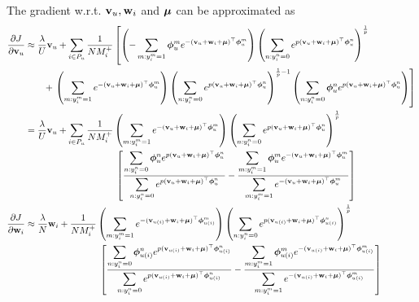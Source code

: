 The gradient w.r.t. $\mathbf{v}_u, \mathbf{w}_i$ and $\bm{\mu}$ can be approximated as 
\begin{equation*}
\begin{aligned}
\frac{\partial J}{\partial \bv_u}
&\approx \frac{\lambda}{U} \bv_u
  + \sum_{i \in P_u} \frac{1}{N M_i^+} \left[
    \left(-\sum_{m: y_i^m = 1} \phibm_u^m e^{-(\bv_u + \w_i + \mubm)^\top \phibm_u^m} \right)
    \left( \sum_{n: y_i^n = 0} e^{p (\bv_u + \w_i + \mubm)^\top \phibm_u^n} \right)^\frac{1}{p} \right. \\
& \hspace{2em} + \left.
    \left( \sum_{m: y_i^m = 1} e^{-(\bv_u + \w_i + \mubm)^\top \phibm_u^m} \right)
    \left( \sum_{n: y_i^n = 0} e^{p (\bv_u + \w_i + \mubm)^\top \phibm_u^n} \right)^{\frac{1}{p} - 1}
    \left( \sum_{n: y_i^n = 0} \phibm_u^n e^{p (\bv_u + \w_i + \mubm)^\top \phibm_u^n} \right) \right] \\
&= \frac{\lambda}{U} \bv_u
  + \sum_{i \in P_u} \frac{1}{N M_i^+} 
    \left( \sum_{m: y_i^m = 1} e^{-(\bv_u + \w_i + \mubm)^\top \phibm_u^m} \right)
    \left( \sum_{n: y_i^n = 0} e^{p (\bv_u + \w_i + \mubm)^\top \phibm_u^n} \right)^\frac{1}{p} \\
& \hspace{9.8em} \left[ 
    \frac{ \displaystyle \sum_{n: y_i^n = 0} \phibm_u^n e^{p (\bv_u + \w_i + \mubm)^\top \phibm_u^n} }
         { \displaystyle \sum_{n: y_i^n = 0} e^{p (\bv_u + \w_i + \mubm)^\top \phibm_u^n} }
    - \frac{ \displaystyle \sum_{m: y_i^m = 1} \phibm_u^m e^{-(\bv_u + \w_i + \mubm)^\top \phibm_u^m} }
           { \displaystyle \sum_{m: y_i^m = 1} e^{-(\bv_u + \w_i + \mubm)^\top \phibm_u^m} } \right] \\
%
\frac{\partial J}{\partial \w_i}
&\approx \frac{\lambda}{N} \w_i
  + \frac{1}{N M_i^+} 
    \left( \sum_{m: y_i^m = 1} e^{-(\bv_{u(i)} + \w_i + \mubm)^\top \phibm_{u(i)}^m} \right)
    \left( \sum_{n: y_i^n = 0} e^{p (\bv_{u(i)} + \w_i + \mubm)^\top \phibm_{u(i)}^n} \right)^\frac{1}{p} \\
& \hspace{8em} \left[ 
    \frac{ \displaystyle \sum_{n: y_i^n = 0} \phibm_{u(i)}^n e^{p (\bv_{u(i)} + \w_i + \mubm)^\top \phibm_{u(i)}^n} }
         { \displaystyle \sum_{n: y_i^n = 0} e^{p (\bv_{u(i)} + \w_i + \mubm)^\top \phibm_{u(i)}^n} }
    - \frac{ \displaystyle \sum_{m: y_i^m = 1} \phibm_{u(i)}^m e^{-(\bv_{u(i)} + \w_i + \mubm)^\top \phibm_{u(i)}^m} }
           { \displaystyle \sum_{m: y_i^m = 1} e^{-(\bv_{u(i)} + \w_i + \mubm)^\top \phibm_{u(i)}^m} } \right] \\

\end{aligned}
\end{equation*}
